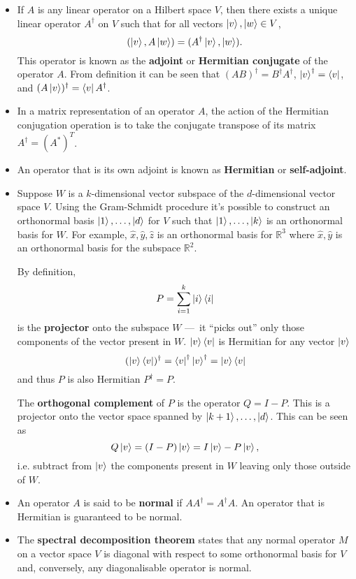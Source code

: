 \documentclass{article}
\begin{document}
\begin{itemize}
  \item If $A$ is any linear operator on a Hilbert space $V$, then there exists a unique linear operator $A^\dag$ on $V$ such that for all vectors $\ket{v}, \ket{w} \in V$, \[(\ket{v}, A \ket{w}) = (A^\dag \ket{v}, \ket{w}).\] This operator is known as the \textbf{adjoint} or \textbf{Hermitian conjugate} of the operator $A$. From definition it can be seen that $(A B)^\dag = B^\dag A^\dag$, $\ket{v}^\dag = \bra{v}$, and $(A \ket{v})^\dag = \bra{v} A^\dag$.

  \item In a matrix representation of an operator $A$, the action of the Hermitian conjugation operation is to take the conjugate transpose of its matrix $A^\dag = (A^*)^T$.

  \item An operator that is its own adjoint is known as \textbf{Hermitian} or \textbf{self-adjoint}.

  \item Suppose $W$ is a $k$-dimensional vector subspace of the $d$-dimensional vector space $V$. Using the Gram-Schmidt procedure it's possible to construct an orthonormal basis $\ket{1}, \ldots, \ket{d}$ for $V$ such that $\ket{1}, \ldots, \ket{k}$ is an orthonormal basis for $W$. For example, $\hat{x}, \hat{y}, \hat{z}$ is an orthonormal basis for $\mathbb{R}^3$ where $\hat{x}, \hat{y}$ is an orthonormal basis for the subspace $\mathbb{R}^2$.

        By definition, \[P = \sum_{i = 1}^k \ket{i} \bra{i}\] is the \textbf{projector} onto the subspace $W$ — it ``picks out'' only those components of the vector present in $W$. $\ket{v} \bra{v}$ is Hermitian for any vector $\ket{v}$ \[(\ket{v} \bra{v})^\dag = \bra{v}^\dag \ket{v}^\dag = \ket{v} \bra{v}\] and thus $P$ is also Hermitian $P^\dag = P$.

        The \textbf{orthogonal complement} of $P$ is the operator $Q = I - P$. This is a projector onto the vector space spanned by $\ket{k + 1}, \ldots, \ket{d}$. This can be seen as \[Q \ket{v} = (I - P) \ket{v} = I \ket{v} - P \ket{v},\] i.e. subtract from $\ket{v}$ the components present in $W$ leaving only those outside of $W$.

  \item An operator $A$ is said to be \textbf{normal} if $A A^\dag = A^\dag A$. An operator that is Hermitian is guaranteed to be normal.

  \item The \textbf{spectral decomposition theorem} states that any normal operator $M$ on a vector space $V$ is diagonal with respect to some orthonormal basis for $V$ and, conversely, any diagonalisable operator is normal.


\end{itemize}
\end{document}
